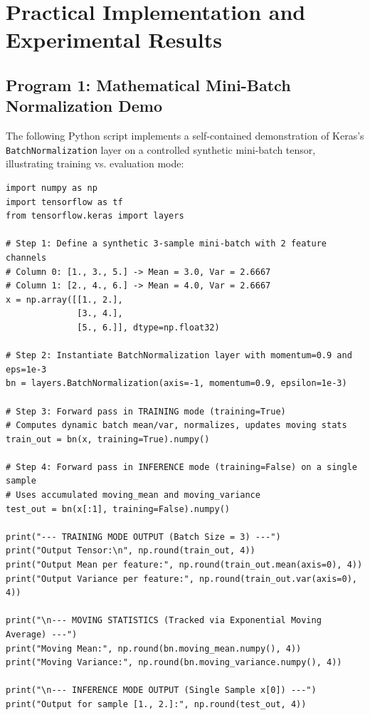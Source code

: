 \documentclass[12pt,a4paper]{article}
\begin{document}
\section{Practical Implementation and Experimental Results}

\subsection{Program 1: Mathematical Mini-Batch Normalization Demo}
The following Python script implements a self-contained demonstration of Keras's \texttt{BatchNormalization} layer on a controlled synthetic mini-batch tensor, illustrating training vs. evaluation mode:

\begin{lstlisting}
import numpy as np
import tensorflow as tf
from tensorflow.keras import layers

# Step 1: Define a synthetic 3-sample mini-batch with 2 feature channels
# Column 0: [1., 3., 5.] -> Mean = 3.0, Var = 2.6667
# Column 1: [2., 4., 6.] -> Mean = 4.0, Var = 2.6667
x = np.array([[1., 2.], 
              [3., 4.], 
              [5., 6.]], dtype=np.float32)

# Step 2: Instantiate BatchNormalization layer with momentum=0.9 and eps=1e-3
bn = layers.BatchNormalization(axis=-1, momentum=0.9, epsilon=1e-3)

# Step 3: Forward pass in TRAINING mode (training=True)
# Computes dynamic batch mean/var, normalizes, updates moving stats
train_out = bn(x, training=True).numpy()

# Step 4: Forward pass in INFERENCE mode (training=False) on a single sample
# Uses accumulated moving_mean and moving_variance
test_out = bn(x[:1], training=False).numpy()

print("--- TRAINING MODE OUTPUT (Batch Size = 3) ---")
print("Output Tensor:\n", np.round(train_out, 4))
print("Output Mean per feature:", np.round(train_out.mean(axis=0), 4))
print("Output Variance per feature:", np.round(train_out.var(axis=0), 4))

print("\n--- MOVING STATISTICS (Tracked via Exponential Moving Average) ---")
print("Moving Mean:", np.round(bn.moving_mean.numpy(), 4))
print("Moving Variance:", np.round(bn.moving_variance.numpy(), 4))

print("\n--- INFERENCE MODE OUTPUT (Single Sample x[0]) ---")
print("Output for sample [1., 2.]:", np.round(test_out, 4))
\end{lstlisting}
\end{document}
